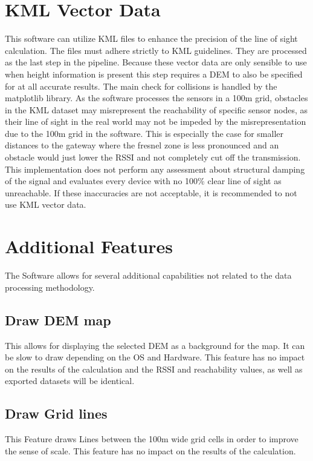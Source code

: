 \documentclass[12pt,a4paper]{article}
\begin{document}
\section{KML Vector Data}
This software can utilize KML files to enhance the precision of the line of sight calculation. The files must adhere strictly to KML guidelines. They are processed as the last step in the pipeline. Because these vector data are only sensible to use when height information is present this step requires a DEM to also be specified for at all accurate results. The main check for collisions is handled by the matplotlib library. As the software processes the sensors in a 100m grid, obstacles in the KML dataset may misrepresent the reachability of specific sensor nodes, as their line of sight in the real world may not be impeded by the misrepresentation due to the 100m grid in the software. This is especially the case for smaller distances to the gateway where the fresnel zone is less pronounced and an obstacle would just lower the RSSI and not completely cut off the transmission. This implementation does not perform any assessment about structural damping of the signal and evaluates every device with no 100\% clear line of sight as unreachable. If these inaccuracies are not acceptable, it is recommended to not use KML vector data.
\section{Additional Features}
The Software allows for several additional capabilities not related to the data processing methodology.
\subsection{Draw DEM map}
This allows for displaying the selected DEM as a background for the map. It can be slow to draw depending on the OS and Hardware. This feature has no impact on the results of the calculation and the RSSI and reachability values, as well as exported datasets will be identical.
\subsection{Draw Grid lines}
This Feature draws Lines between the 100m wide grid cells in order to improve the sense of scale. This feature has no impact on the results of the calculation.
\end{document}
